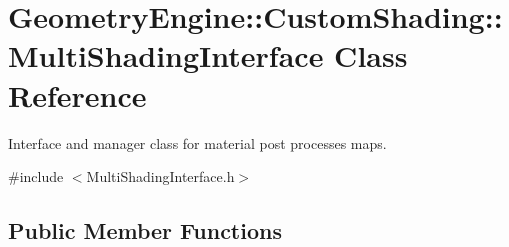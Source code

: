 \hypertarget{class_geometry_engine_1_1_custom_shading_1_1_multi_shading_interface}{}\section{Geometry\+Engine\+::Custom\+Shading\+::Multi\+Shading\+Interface Class Reference}
\label{class_geometry_engine_1_1_custom_shading_1_1_multi_shading_interface}


Interface and manager class for material post processes maps.  




{\ttfamily \#include $<$Multi\+Shading\+Interface.\+h$>$}

\subsection*{Public Member Functions}
